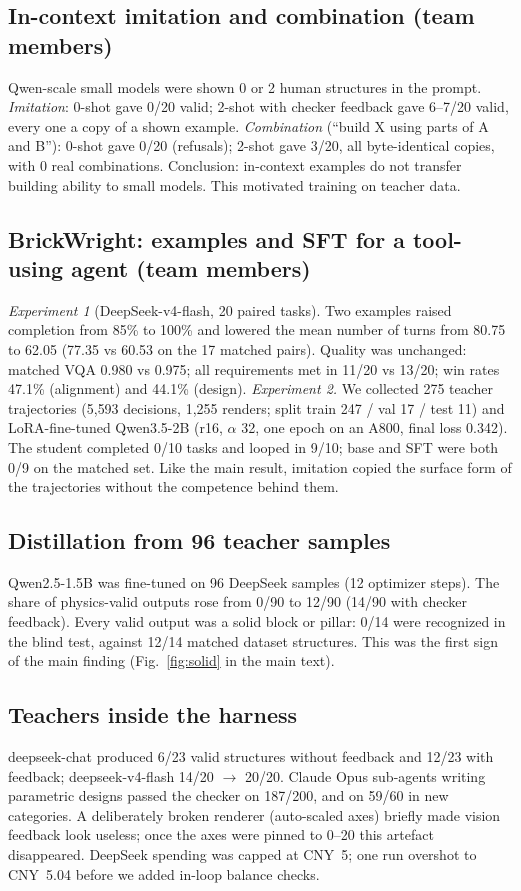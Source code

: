 \subsection{In-context imitation and combination (team members)}
\label{ex:icl}
Qwen-scale small models were shown 0 or 2 human structures in the prompt. \emph{Imitation}: 0-shot gave 0/20 valid; 2-shot with checker feedback gave 6--7/20 valid, every one a copy of a shown example. \emph{Combination} (``build X using parts of A and B''): 0-shot gave 0/20 (refusals); 2-shot gave 3/20, all byte-identical copies, with 0 real combinations. Conclusion: in-context examples do not transfer building ability to small models. This motivated training on teacher data.

\subsection{BrickWright: examples and SFT for a tool-using agent (team members)}
\label{ex:brickwright}
\emph{Experiment 1} (DeepSeek-v4-flash, 20 paired tasks). Two examples raised completion from 85\% to 100\% and lowered the mean number of turns from 80.75 to 62.05 (77.35 vs 60.53 on the 17 matched pairs). Quality was unchanged: matched VQA 0.980 vs 0.975; all requirements met in 11/20 vs 13/20; win rates 47.1\% (alignment) and 44.1\% (design). \emph{Experiment 2.} We collected 275 teacher trajectories (5{,}593 decisions, 1{,}255 renders; split train 247 / val 17 / test 11) and LoRA-fine-tuned Qwen3.5-2B (r16, $\alpha$ 32, one epoch on an A800, final loss 0.342). The student completed 0/10 tasks and looped in 9/10; base and SFT were both 0/9 on the matched set. Like the main result, imitation copied the surface form of the trajectories without the competence behind them.

\subsection{Distillation from 96 teacher samples}
\label{ex:distill}
Qwen2.5-1.5B was fine-tuned on 96 DeepSeek samples (12 optimizer steps). The share of physics-valid outputs rose from 0/90 to 12/90 (14/90 with checker feedback). Every valid output was a solid block or pillar: 0/14 were recognized in the blind test, against 12/14 matched dataset structures. This was the first sign of the main finding (Fig.~\ref{fig:solid} in the main text).

\subsection{Teachers inside the harness}
\label{ex:teachers}
deepseek-chat produced 6/23 valid structures without feedback and 12/23 with feedback; deepseek-v4-flash 14/20 $\to$ 20/20. Claude Opus sub-agents writing parametric designs passed the checker on 187/200, and on 59/60 in new categories. A deliberately broken renderer (auto-scaled axes) briefly made vision feedback look useless; once the axes were pinned to 0--20 this artefact disappeared. DeepSeek spending was capped at CNY~5; one run overshot to CNY~5.04 before we added in-loop balance checks.

